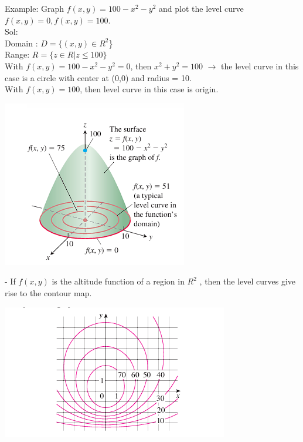 \documentclass[12pt]{article}
\begin{document}
Example: Graph $f(x,y) = 100 -x^2 -y^2$ and plot the level curve $f(x,y)=0,f(x,y) = 100$.\\ 
Sol:\\
Domain : $D = \{(x,y) \in R^2$\} \\
Range: $R = \{z \in R | z \leq 100\}$\\
With $f(x,y) = 100 -x^2 -y^2 = 0$, then $x^2 +y^2 =100$ $\rightarrow$ the level curve in this case is a circle with center at (0,0) and radius = 10. \\
With $f(x,y) = 100$, then level curve in this case is origin.\\ 
\begin{center}
    \includegraphics[scale=1]{Ảnh chụp màn hình 2024-03-26 025527.png}
\end{center}

- If $f(x, y)$ is the altitude function of a region in $R^2$
, then the level curves give rise to the contour map.\\
\begin{center}
    \includegraphics[scale=1]{Ảnh chụp màn hình 2024-03-26 030911.png}
\end{center}
\end{document}
